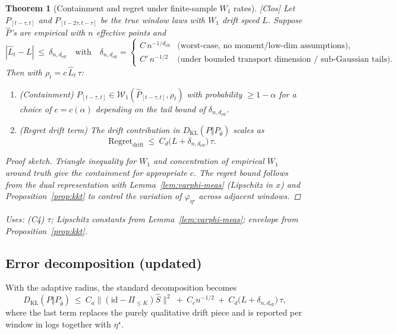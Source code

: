 \documentclass[10pt]{article}
\newcommand{\uses}[1]{\par\smallskip\noindent\textit{Uses: }#1\par\smallskip}
\newenvironment{proofsketch}{\begin{proof}[Proof sketch]}{\end{proof}}
\newtheorem{theorem}{Theorem}
\begin{document}
\begin{theorem}[Containment and regret under finite-sample $W_1$ rates]\label{thm:adaptive-radius}
\emph{[\textup{Clos}]} Let $P_{[t-\tau,t]}$ and $P_{[t-2\tau,t-\tau]}$ be the true window laws with $W_1$ drift speed $L$. Suppose $\hat P$’s are empirical with $n$ effective points and
\[
|\hat L_t - L|\ \le\ \delta_{n,d_{\mathrm{eff}}}
\quad\text{with}\quad
\delta_{n,d_{\mathrm{eff}}}=\begin{cases}
C\,n^{-1/d_{\mathrm{eff}}} & \text{(worst-case, no moment/low-dim assumptions)},\\[2pt]
C'\,n^{-1/2} & \text{(under bounded transport dimension / sub-Gaussian tails)}.
\end{cases}
\]
Then with $\rho_t=c\,\hat L_t\,\tau$:
\begin{enumerate}[leftmargin=*]
\item (\emph{Containment}) $P_{[t-\tau,t]} \in \mathcal W_1(\hat P_{[t-\tau,t]},\rho_t)$ with probability $\ge 1-\alpha$ for a choice of $c=c(\alpha)$ depending on the tail bound of $\delta_{n,d_{\mathrm{eff}}}$.
\item (\emph{Regret drift term}) The drift contribution in $D_{\mathrm{KL}}(P\Vert P_{\widehat\theta})$ scales as
\[
\mathrm{Regret}_\mathrm{drift}\ \le\ C_d \big(L+\delta_{n,d_{\mathrm{eff}}}\big)\,\tau.
\]
\end{enumerate}
\begin{proofsketch}
Triangle inequality for $W_1$ and concentration of empirical $W_1$ around truth give the containment for appropriate $c$. The regret bound follows from the dual representation with Lemma~\ref{lem:varphi-meas} (Lipschitz in $x$) and Proposition~\ref{prop:kkt} to control the variation of $\varphi_{\eta^\star}$ across adjacent windows.
\end{proofsketch}
\uses{(C4) $\tau$; Lipschitz constants from Lemma~\ref{lem:varphi-meas}; envelope from Proposition~\ref{prop:kkt}.}
\end{theorem}

\subsection{Error decomposition (updated)}
With the adaptive radius, the standard decomposition becomes
\[
D_{\mathrm{KL}}(P\Vert P_{\widehat\theta})
\ \le\ C_a\big\|(\mathrm{id}-\Pi_{\le K})\hat S\big\|^2\ +\ C_e n^{-1/2}\ +\ C_d\big(L+\delta_{n,d_{\mathrm{eff}}}\big)\,\tau,
\]
where the last term replaces the purely qualitative drift piece and is reported per window in logs together with $\eta^\star$.
\end{document}
